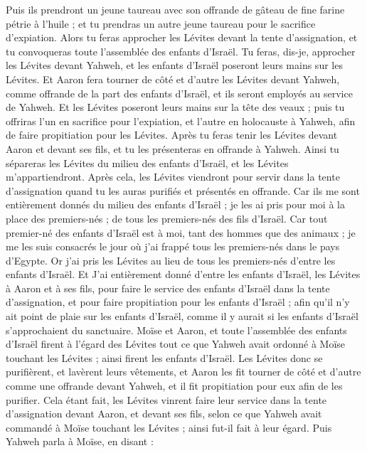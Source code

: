 \begin{multicols}{2}
Puis ils prendront un jeune taureau avec son offrande de gâteau de fine farine pétrie à l'huile ; et tu prendras un autre jeune taureau pour le sacrifice d'expiation.
Alors tu feras approcher les Lévites devant la tente d'assignation, et tu convoqueras toute l'assemblée des enfants d'Israël.
Tu feras, dis-je, approcher les Lévites devant Yahweh, et les enfants d'Israël poseront leurs mains sur les Lévites.
Et Aaron fera tourner de côté et d'autre les Lévites devant Yahweh, comme offrande de la part des enfants d'Israël, et ils seront employés au service de Yahweh.
Et les Lévites poseront leurs mains sur la tête des veaux ; puis tu offriras l'un en sacrifice pour l'expiation, et l'autre en holocauste à Yahweh, afin de faire propitiation pour les Lévites.
Après tu feras tenir les Lévites devant Aaron et devant ses fils, et tu les présenteras en offrande à Yahweh.
Ainsi tu sépareras les Lévites du milieu des enfants d'Israël, et les Lévites m'appartiendront.
Après cela, les Lévites viendront pour servir dans la tente d'assignation quand tu les auras purifiés et présentés en offrande.
Car ils me sont entièrement donnés du milieu des enfants d'Israël ; je les ai pris pour moi à la place des premiers-nés ; de tous les premiers-nés des fils d'Israël.
Car tout premier-né des enfants d'Israël est à moi, tant des hommes que des animaux ; je me les suis consacrés le jour où j'ai frappé tous les premiers-nés dans le pays d'Egypte.
Or j'ai pris les Lévites au lieu de tous les premiers-nés d'entre les enfants d'Israël.
Et J'ai entièrement donné d'entre les enfants d'Israël, les Lévites à Aaron et à ses fils, pour faire le service des enfants d'Israël dans la tente d'assignation, et pour faire propitiation pour les enfants d'Israël ; afin qu'il n'y ait point de plaie sur les enfants d'Israël, comme il y aurait si les enfants d'Israël s'approchaient du sanctuaire.
Moïse et Aaron, et toute l'assemblée des enfants d'Israël firent à l'égard des Lévites tout ce que Yahweh avait ordonné à Moïse touchant les Lévites ; ainsi firent les enfants d'Israël.
Les Lévites donc se purifièrent, et lavèrent leurs vêtements, et Aaron les fit tourner de côté et d'autre comme une offrande devant Yahweh, et il fit propitiation pour eux afin de les purifier.
Cela étant fait, les Lévites vinrent faire leur service dans la tente d'assignation devant Aaron, et devant ses fils, selon ce que Yahweh avait commandé à Moïse touchant les Lévites ; ainsi fut-il fait à leur égard.
Puis Yahweh parla à Moïse, en disant :

\end{multicols}
